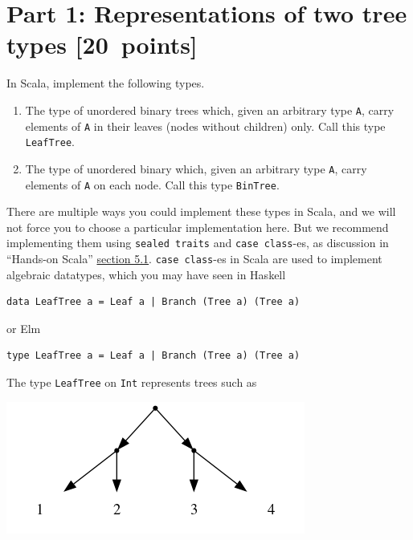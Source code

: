 \documentclass[11pt]{article}
\begin{document}
\section*{Part 1: Representations of two tree types  [20 points]}
\label{sec:orgfd3b69b}
In Scala, implement the following types.
\begin{enumerate}
\item The type of unordered binary trees which,
given an arbitrary type \texttt{A},
carry elements of \texttt{A} in their leaves
(nodes without children) only.
Call this type \texttt{LeafTree}.
\item The type of unordered binary which,
given an arbitrary type \texttt{A},
carry elements of \texttt{A} on each node.
Call this type \texttt{BinTree}.
\end{enumerate}

There are multiple ways you could implement these types in Scala,
and we will not force you to choose a particular implementation here.
But we recommend implementing them using \texttt{sealed traits} and \texttt{case class}-es,
as discussion in “Hands-on Scala”
\href{https://www.handsonscala.com/chapter-5-notable-scala-features.html\#section-5-1-case-classes-and-sealed-traits}{section 5.1}.
\texttt{case class}-es in Scala are used to implement algebraic datatypes,
which you may have seen in Haskell
\begin{verbatim}
data LeafTree a = Leaf a | Branch (Tree a) (Tree a)
\end{verbatim}
or Elm
\begin{verbatim}
type LeafTree a = Leaf a | Branch (Tree a) (Tree a)
\end{verbatim}

The type \texttt{LeafTree} on \texttt{Int} represents trees such as
\begin{center}
\includegraphics[width=\textwidth]{media/LeafTree.png}
\end{center}
\end{document}
